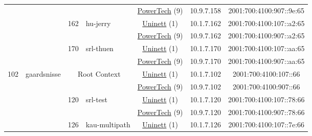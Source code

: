 \begin{small}
\begin{center}
\begin{longtable}{|c|c|c|c|c|c|c|c|}
  &  &  &  & \multicolumn{2}{|c|}{\tiny{\href{http://www.powertech.no}{PowerTech} (9)}} & \tiny{10.9.7.158} & \tiny{2001:700:4100:907::9e:65} \\* \cline{3-3}\cline{4-4}\cline{5-5}\cline{6-6}\cline{7-7}\cline{8-8}
  &  & \multirow{2}{*}{\tiny{162}} & \multicolumn{1}{|l|}{\multirow{2}{*}{\tiny{hu-jerry}}} & \multicolumn{2}{|c|}{\tiny{\href{https://www.uninett.no}{Uninett} (1)}} & \tiny{10.1.7.162} & \tiny{2001:700:4100:107::a2:65} \\* \cline{5-5}\cline{6-6}\cline{7-7}\cline{8-8}
  &  &  &  & \multicolumn{2}{|c|}{\tiny{\href{http://www.powertech.no}{PowerTech} (9)}} & \tiny{10.9.7.162} & \tiny{2001:700:4100:907::a2:65} \\* \cline{3-3}\cline{4-4}\cline{5-5}\cline{6-6}\cline{7-7}\cline{8-8}
  &  & \multirow{2}{*}{\tiny{170}} & \multicolumn{1}{|l|}{\multirow{2}{*}{\tiny{srl-thuen}}} & \multicolumn{2}{|c|}{\tiny{\href{https://www.uninett.no}{Uninett} (1)}} & \tiny{10.1.7.170} & \tiny{2001:700:4100:107::aa:65} \\* \cline{5-5}\cline{6-6}\cline{7-7}\cline{8-8}
  &  &  &  & \multicolumn{2}{|c|}{\tiny{\href{http://www.powertech.no}{PowerTech} (9)}} & \tiny{10.9.7.170} & \tiny{2001:700:4100:907::aa:65} \\ \hline
 \multirow{26}{*}{\tiny{102}} & \multicolumn{1}{|l|}{\multirow{26}{*}{\tiny{gaardsnisse}}} & \multicolumn{2}{|c|}{\multirow{2}{*}{\tiny{Root Context}}} & \multicolumn{2}{|c|}{\tiny{\href{https://www.uninett.no}{Uninett} (1)}} & \tiny{10.1.7.102} & \tiny{2001:700:4100:107::66} \\* \cline{5-5}\cline{6-6}\cline{7-7}\cline{8-8}
  &  & \multicolumn{2}{|c|}{} & \multicolumn{2}{|c|}{\tiny{\href{http://www.powertech.no}{PowerTech} (9)}} & \tiny{10.9.7.102} & \tiny{2001:700:4100:907::66} \\* \cline{3-3}\cline{4-4}\cline{5-5}\cline{6-6}\cline{7-7}\cline{8-8}
  &  & \multirow{2}{*}{\tiny{120}} & \multicolumn{1}{|l|}{\multirow{2}{*}{\tiny{srl-test}}} & \multicolumn{2}{|c|}{\tiny{\href{https://www.uninett.no}{Uninett} (1)}} & \tiny{10.1.7.120} & \tiny{2001:700:4100:107::78:66} \\* \cline{5-5}\cline{6-6}\cline{7-7}\cline{8-8}
  &  &  &  & \multicolumn{2}{|c|}{\tiny{\href{http://www.powertech.no}{PowerTech} (9)}} & \tiny{10.9.7.120} & \tiny{2001:700:4100:907::78:66} \\* \cline{3-3}\cline{4-4}\cline{5-5}\cline{6-6}\cline{7-7}\cline{8-8}
  &  & \multirow{2}{*}{\tiny{126}} & \multicolumn{1}{|l|}{\multirow{2}{*}{\tiny{kau-multipath}}} & \multicolumn{2}{|c|}{\tiny{\href{https://www.uninett.no}{Uninett} (1)}} & \tiny{10.1.7.126} & \tiny{2001:700:4100:107::7e:66} \\* \cline{5-5}\cline{6-6}\cline{7-7}\cline{8-8}

\end{longtable}
\end{center}
\end{small}
